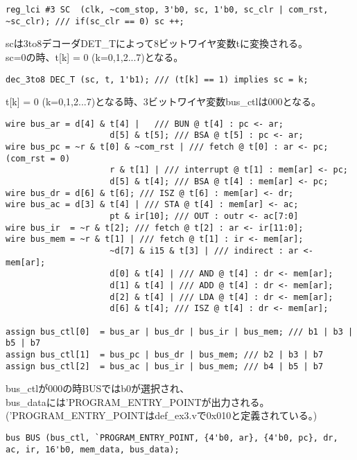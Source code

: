 \documentclass{jsarticle}
\begin{document}
\begin{lstlisting}[caption=cpu\_ex3.v 73行目]
reg_lci #3 SC  (clk, ~com_stop, 3'b0, sc, 1'b0, sc_clr | com_rst, ~sc_clr); /// if(sc_clr == 0) sc ++;
\end{lstlisting}

scは3to8デコーダDET\_Tによって8ビットワイヤ変数tに変換される。\\
sc=0の時、t[k] = 0 (k=0,1,2...7)となる。

\begin{lstlisting}[caption=cpu\_ex3.v 94行目]
dec_3to8 DEC_T (sc, t, 1'b1); /// (t[k] == 1) implies sc = k;
\end{lstlisting}

t[k] = 0 (k=0,1,2...7)となる時、3ビットワイヤ変数bus\_ctlは000となる。

\begin{lstlisting}[caption=cpu\_ex3.v 217～235行目]
wire bus_ar = d[4] & t[4] |   /// BUN @ t[4] : pc <- ar;
                     d[5] & t[5]; /// BSA @ t[5] : pc <- ar;
wire bus_pc = ~r & t[0] & ~com_rst | /// fetch @ t[0] : ar <- pc; (com_rst = 0)
                     r & t[1] | /// interrupt @ t[1] : mem[ar] <- pc;
                     d[5] & t[4]; /// BSA @ t[4] : mem[ar] <- pc;
wire bus_dr = d[6] & t[6]; /// ISZ @ t[6] : mem[ar] <- dr;
wire bus_ac = d[3] & t[4] | /// STA @ t[4] : mem[ar] <- ac;
                     pt & ir[10]; /// OUT : outr <- ac[7:0]
wire bus_ir  = ~r & t[2]; /// fetch @ t[2] : ar <- ir[11:0];
wire bus_mem = ~r & t[1] | /// fetch @ t[1] : ir <- mem[ar];
                     ~d[7] & i15 & t[3] | /// indirect : ar <- mem[ar];
                     d[0] & t[4] | /// AND @ t[4] : dr <- mem[ar];
                     d[1] & t[4] | /// ADD @ t[4] : dr <- mem[ar];
                     d[2] & t[4] | /// LDA @ t[4] : dr <- mem[ar];
                     d[6] & t[4]; /// ISZ @ t[4] : dr <- mem[ar];

assign bus_ctl[0]  = bus_ar | bus_dr | bus_ir | bus_mem; /// b1 | b3 | b5 | b7
assign bus_ctl[1]  = bus_pc | bus_dr | bus_mem; /// b2 | b3 | b7
assign bus_ctl[2]  = bus_ac | bus_ir | bus_mem; /// b4 | b5 | b7
\end{lstlisting}

bus\_ctlが000の時BUSではb0が選択され、 \\
bus\_dataには'PROGRAM\_ENTRY\_POINTが出力される。  \\
('PROGRAM\_ENTRY\_POINTはdef\_ex3.vで0x010と定義されている。)

\begin{lstlisting}[caption=cpu\_ex3.v 89行目]
bus BUS (bus_ctl, `PROGRAM_ENTRY_POINT, {4'b0, ar}, {4'b0, pc}, dr, ac, ir, 16'b0, mem_data, bus_data);
\end{lstlisting}
\end{document}
